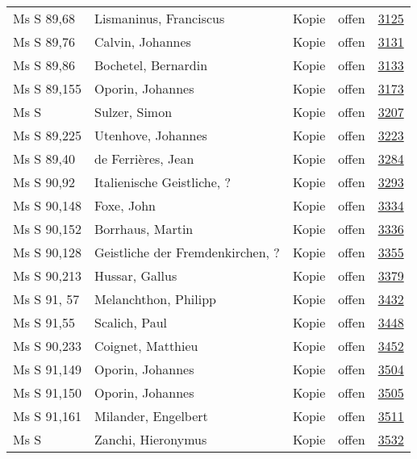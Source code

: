 \documentclass[10pt,a4paper,landscape]{report}
\begin{document}
\begin{longtable}{p{16cm}p{4cm}llr}
Ms S 89,68	&	Lismaninus, Franciscus	&	Kopie	&	offen	&	\href{http://130.60.24.72/assignment/3125}{3125}\\
Ms S 89,76	&	Calvin, Johannes	&	Kopie	&	offen	&	\href{http://130.60.24.72/assignment/3131}{3131}\\
Ms S 89,86	&	Bochetel, Bernardin	&	Kopie	&	offen	&	\href{http://130.60.24.72/assignment/3133}{3133}\\
Ms S 89,155	&	Oporin, Johannes	&	Kopie	&	offen	&	\href{http://130.60.24.72/assignment/3173}{3173}\\
Ms S	&	Sulzer, Simon	&	Kopie	&	offen	&	\href{http://130.60.24.72/assignment/3207}{3207}\\
Ms S 89,225	&	Utenhove, Johannes	&	Kopie	&	offen	&	\href{http://130.60.24.72/assignment/3223}{3223}\\
Ms S 89,40	&	de Ferrières, Jean	&	Kopie	&	offen	&	\href{http://130.60.24.72/assignment/3284}{3284}\\
Ms S 90,92	&	Italienische Geistliche, ?	&	Kopie	&	offen	&	\href{http://130.60.24.72/assignment/3293}{3293}\\
Ms S 90,148	&	Foxe, John	&	Kopie	&	offen	&	\href{http://130.60.24.72/assignment/3334}{3334}\\
Ms S 90,152	&	Borrhaus, Martin	&	Kopie	&	offen	&	\href{http://130.60.24.72/assignment/3336}{3336}\\
Ms S 90,128	&	Geistliche der Fremdenkirchen, ?	&	Kopie	&	offen	&	\href{http://130.60.24.72/assignment/3355}{3355}\\
Ms S 90,213	&	Hussar, Gallus	&	Kopie	&	offen	&	\href{http://130.60.24.72/assignment/3379}{3379}\\
Ms S 91, 57	&	Melanchthon, Philipp	&	Kopie	&	offen	&	\href{http://130.60.24.72/assignment/3432}{3432}\\
Ms S 91,55	&	Scalich, Paul	&	Kopie	&	offen	&	\href{http://130.60.24.72/assignment/3448}{3448}\\
Ms S 90,233	&	Coignet, Matthieu	&	Kopie	&	offen	&	\href{http://130.60.24.72/assignment/3452}{3452}\\
Ms S 91,149	&	Oporin, Johannes	&	Kopie	&	offen	&	\href{http://130.60.24.72/assignment/3504}{3504}\\
Ms S 91,150	&	Oporin, Johannes	&	Kopie	&	offen	&	\href{http://130.60.24.72/assignment/3505}{3505}\\
Ms S 91,161	&	Milander, Engelbert	&	Kopie	&	offen	&	\href{http://130.60.24.72/assignment/3511}{3511}\\
Ms S	&	Zanchi, Hieronymus	&	Kopie	&	offen	&	\href{http://130.60.24.72/assignment/3532}{3532}\\

\end{longtable}
\end{document}
